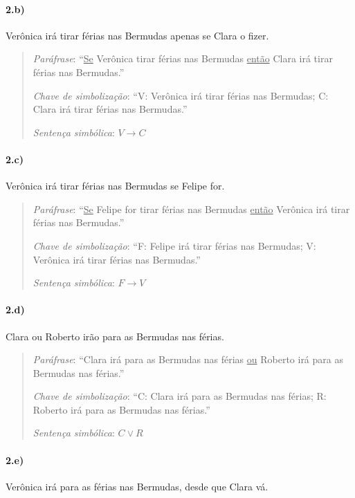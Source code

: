\documentclass[pdftex,a4paper,12pt,brazil]{article} %
\begin{document}
\paragraph{2.b)} Verônica irá tirar férias nas Bermudas apenas se Clara o fizer.

\begin{quote}
  \emph{Paráfrase}: ``\underline{Se} Verônica tirar férias nas Bermudas \underline{então} Clara irá tirar férias nas Bermudas.''

  \emph{Chave de simbolização}: ``V: Verônica irá tirar férias nas Bermudas; C: Clara irá tirar férias nas Bermudas.''

  \emph{Sentença simbólica}: $V \rightarrow C$
\end{quote}

\paragraph{2.c)} Verônica irá tirar férias nas Bermudas se Felipe for.

\begin{quote}
  \emph{Paráfrase}: ``\underline{Se} Felipe for tirar férias nas Bermudas \underline{então} Verônica irá tirar férias nas Bermudas.''

  \emph{Chave de simbolização}: ``F: Felipe irá tirar férias nas Bermudas; V: Verônica irá tirar férias nas Bermudas.''

  \emph{Sentença simbólica}: $F \rightarrow V$
\end{quote}

\paragraph{2.d)} Clara ou Roberto irão para as Bermudas nas férias.

\begin{quote}
  \emph{Paráfrase}: ``Clara irá para as Bermudas nas férias \underline{ou} Roberto irá para as Bermudas nas férias.''

  \emph{Chave de simbolização}: ``C: Clara irá para as Bermudas nas férias; R: Roberto irá para as Bermudas nas férias.''

  \emph{Sentença simbólica}: $C \vee R$
\end{quote}

\paragraph{2.e)} Verônica irá para as férias nas Bermudas, desde que Clara vá.
\end{document}
